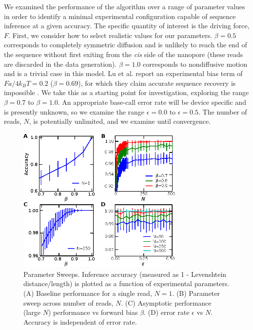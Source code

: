 \documentclass{biophys_letter}
\newcommand{\bias}{\beta}
\newcommand{\err}{\epsilon}
\newcommand{\kje}[1]{\textcolor{BurntOrange}{#1}}
\begin{document}
We examined the performance of the algorithm over a range of parameter values in order to identify a minimal experimental configuration capable of sequence inference at a given accuracy.
\kje{The specific quantity of interest is the driving force, $F$.}
First, we consider how to select realistic values for our parameters.
$\bias=0.5$ corresponds to completely symmetric diffusion and is unlikely to reach the end of the sequence without first exiting from the {\it cis} side of the nanopore (these reads are discarded in the data generation).
$\bias=1.0$ corresponds to nondiffusive motion and is a trivial case in this model.
Lu et al. report an experimental bias term of $Fa/4k_{B}T=0.2$ ($\bias=0.69$), for which they claim accurate sequence recovery is impossible \cite{Lu:2011}.
We take this as a starting point for investigation, exploring the range $\bias=0.7$ to $\bias=1.0$.
An appropriate base-call error rate will be device specific and is presently unknown, so we examine the range $\err=0.0$ to $\err=0.5$.
The number of reads, $N$, is potentially unlimited, and we examine until convergence.

\begin{figure}
  \centering
  \includegraphics[width=3.25in]{fig/stochseq-fig3.eps}  
  \caption{Parameter Sweeps. Inference accuracy (measured as 1 - Levenshtein distance/length) is plotted as a function of experimental parameters. (A) Baseline performance for a single read, $N=1$. (B) Parameter sweep across number of reads, $N$. (C) Asymptotic performance (large $N$) performance vs forward bias $\bias$. (D) error rate $\err$ vs $N$. Accuracy is independent of error rate.}
  \label{fig:parameter_sweeps}
\end{figure}
\end{document}
